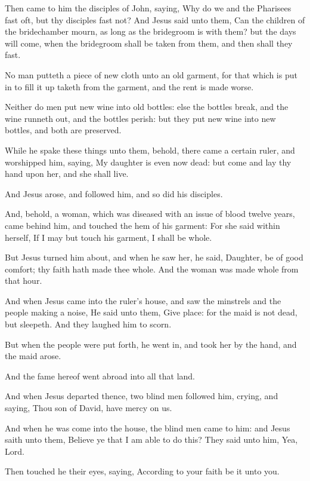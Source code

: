 \Verse Then came to him the disciples of John, saying, Why do we and the Pharisees fast oft, but thy disciples fast not?  \Verse And Jesus said unto them, Can the children of the bridechamber mourn, as long as the bridegroom is with them? but the days will come, when the bridegroom shall be taken from them, and then shall they fast.

\Verse No man putteth a piece of new cloth unto an old garment, for that which is put in to fill it up taketh from the garment, and the rent is made worse.

\Verse Neither do men put new wine into old bottles: else the bottles break, and the wine runneth out, and the bottles perish: but they put new wine into new bottles, and both are preserved.

\Verse While he spake these things unto them, behold, there came a certain ruler, and worshipped him, saying, My daughter is even now dead: but come and lay thy hand upon her, and she shall live.

\Verse And Jesus arose, and followed him, and so did his disciples.

\Verse And, behold, a woman, which was diseased with an issue of blood twelve years, came behind him, and touched the hem of his garment: \Verse For she said within herself, If I may but touch his garment, I shall be whole.

\Verse But Jesus turned him about, and when he saw her, he said, Daughter, be of good comfort; thy faith hath made thee whole. And the woman was made whole from that hour.

\Verse And when Jesus came into the ruler's house, and saw the minstrels and the people making a noise, \Verse He said unto them, Give place: for the maid is not dead, but sleepeth. And they laughed him to scorn.

\Verse But when the people were put forth, he went in, and took her by the hand, and the maid arose.

\Verse And the fame hereof went abroad into all that land.

\Verse And when Jesus departed thence, two blind men followed him, crying, and saying, Thou son of David, have mercy on us.

\Verse And when he was come into the house, the blind men came to him: and Jesus saith unto them, Believe ye that I am able to do this? They said unto him, Yea, Lord.

\Verse Then touched he their eyes, saying, According to your faith be it unto you.

